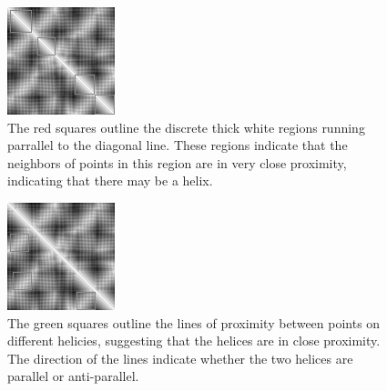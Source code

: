 \documentclass[12pt, a4paper, twocolumn, fullpage]{article}
\theoremstyle{plain}
\theoremstyle{definition}
\theoremstyle{remark}
\begin{document}
\begin{figure}[h]
    \centering
    \includegraphics[width=.7\linewidth]{1ux8matAhelix}
    \caption{The red squares outline the discrete thick white regions running parrallel to the diagonal line. These regions indicate that the neighbors of points in this region are in very close proximity, indicating that there may be a helix. }
    \label{1ux8matAhelix}
\end{figure}

    
\begin{figure}[h]
    \centering
    \includegraphics[width=.7\linewidth]{1ux8matBetaSheets}
    \caption{The green squares outline the lines of proximity between points on different helicies, suggesting that the helices are in close proximity. The direction of the lines indicate whether the two helices are parallel or anti-parallel.}
    \label{1ux8matBetaSheets}
\end{figure}
\end{document}
